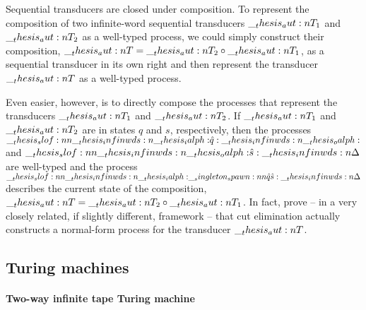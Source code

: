 Sequential transducers are closed under composition\autocite{??}.
To represent the composition of two infinite-word sequential transducers $\__thesis_aut:n {T}_1$ and $\__thesis_aut:n {T}_2$ as a well-typed process, we could simply construct their composition, $\__thesis_aut:n {T} = \__thesis_aut:n {T}_2 \circ \__thesis_aut:n {T}_1$, as a sequential transducer in its own right and then represent the transducer $\__thesis_aut:n {T}$ as a well-typed process.

Even easier, however, is to directly compose the processes that represent the transducers $\__thesis_aut:n {T}_1$ and $\__thesis_aut:n {T}_2$.
If $\__thesis_aut:n {T}_1$ and $\__thesis_aut:n {T}_2$ are in states $q$ and $s$, respectively, then the processes $\slof{\infinwds{\ialph} |- \defp{q} : \infinwds{\oalph}}$ and $\slof{\infinwds{\oalph} |- \defp{s} : \infinwds{\Delta}}$ are well-typed and the process $\slof{\infinwds{\ialph} |- \spawn{\defp{q}}{\defp{s}} : \infinwds{\Delta}}$  describes the current state of the composition, $\__thesis_aut:n {T} = \__thesis_aut:n {T}_2 \circ \__thesis_aut:n {T}_1$.
In fact, \textcite{DeYoung+Pfenning:APLAS16} prove -- in a very closely related, if slightly different, framework -- that cut elimination actually constructs a normal-form process for the transducer $\__thesis_aut:n {T}$.

\subsection{Turing machines}\label{sec:process-chains:turing-machines}

\paragraph*{Two-way infinite tape Turing machine}


